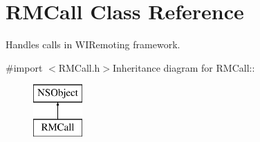 \hypertarget{interface_r_m_call}{
\section{RMCall Class Reference}
\label{interface_r_m_call}
}


Handles calls in WIRemoting framework.  


{\ttfamily \#import $<$RMCall.h$>$}Inheritance diagram for RMCall::\begin{figure}[H]
\begin{center}
\leavevmode
\includegraphics[height=2cm]{interface_r_m_call}
\end{center}
\end{figure}
